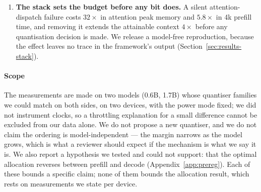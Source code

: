 \begin{enumerate}
\item \textbf{The stack sets the budget before any bit does.} A silent
      attention-dispatch failure costs $32\times$ in attention peak memory and
      $5.8\times$ in 4k prefill time, and removing it extends the attainable
      context $4\times$ before any quantisation decision is made. We release a
      model-free reproduction, because the effect leaves no trace in the
      framework's output (Section~\ref{sec:results-stack}).
\end{enumerate}

\paragraph*{Scope}
The measurements are made on two models (0.6B, 1.7B) whose quantiser families we
could match on both sides, on two devices, with the power mode fixed; we did not
instrument clocks, so a throttling explanation for a small difference cannot be
excluded from our data alone. We do not propose a new quantiser, and we do not
claim the ordering is model-independent --- the margin narrows as the model
grows, which is what a reviewer should expect if the mechanism is what we say it
is. We also report a hypothesis we tested and could not support: that the
optimal allocation reverses between prefill and decode
(Appendix~\ref{app:prereg}). Each of these bounds a specific claim; none of them
bounds the allocation result, which rests on measurements we state per device.
